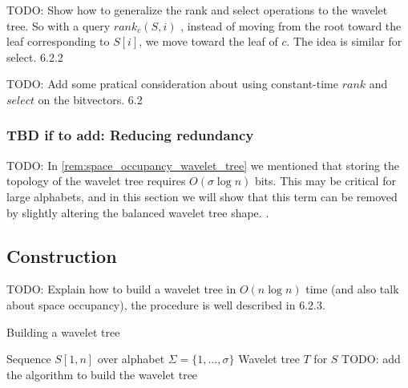 \noindent TODO: Show how to generalize the rank and select operations to the wavelet tree. So with a query $rank_c(S,i)$ , instead of moving from the root toward the leaf corresponding to $S[i]$, we move toward the leaf of $c$. The idea is similar for select. \cite{navarro2016compact} 6.2.2 \vspace{0.4cm}

\noindent TODO: Add some pratical consideration about using constant-time $rank$ and $select$ on the bitvectors. \cite{navarro2016compact} 6.2

\subsubsection*{TBD if to add: Reducing redundancy}
TODO: In \ref{rem:space_occupancy_wavelet_tree} we mentioned that storing the topology of the wavelet tree requires $O(\sigma \log n)$ bits. This may be critical for large alphabets, and in this section we will show that this term can be removed by slightly altering the balanced wavelet tree shape. \cite{MAKINEN2007332,MAKINEN2006703}.

\subsection{Construction}
TODO: Explain how to build a wavelet tree in $O(n \log n)$ time (and also talk about space occupancy), the procedure is well described in \cite{navarro2016compact} 6.2.3.

\begin{algorithm}
    \caption{Building a wavelet tree}\label{alg:build_wt}
    \begin{algorithmic}
        \Require Sequence $S[1,n]$ over alphabet $\Sigma = \{1,\dots,\sigma\}$
        \Ensure Wavelet tree $T$ for $S$
        \State TODO: add the algorithm to build the wavelet tree
    \end{algorithmic}
\end{algorithm}
